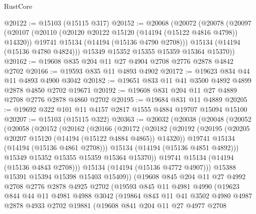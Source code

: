 \begin{lexlean}{RustCore}
\begin{coremodule}
@20122 := @15103 (@15115 @317)
@20152 := @20068
    (@20072
      (@20078
        (@20097
          (@20107
            (@20110 (@20120 @20122 @15120 (@14194 (@15122 @4816 @4798)) @14320))
            @19741
            @15134
            (@14194 (@15136 @4790 @2708)))
          @15134
          (@14194 (@15136 @4780 @4824)))
        @15349
        @15352
        @15355
        @15359
        @15364
        @15370))
@20162 := @19608 @835 @204 @11 @27 @4904 @2708 @2776 @2878 @4842 @2702
@20166 := @19593 @835 @11 @4893 @4902
@20172 := @19623 @834 @44 @11 @4893 @4900 @3042
@20182 := @19651 @833 @11 @41 @3500 @4892 @4899 @2878 @4850 @2702 @19671
@20192 := @19608 @831 @204 @11 @27 @4889 @2708 @2776 @2878 @4860 @2702
@20195 := @19684 @831 @11 @4889
@20205 := @19692 @322 @101 @11 @4157 @2817 @1555 @4884 @19707 @15094 @15100
@20207 := @15103 (@15115 @322)
@20363 := @20032
    (@20038
      (@20048
        (@20052
          (@20058
            (@20152
              (@20162
                (@20166
                  (@20172
                    (@20182
                      (@20192
                        (@20195 (@20205 @20207 @15120 (@14194 (@15122 @4884 @4865)) @14320))
                        @19741
                        @15134
                        (@14194 (@15136 @4861 @2708)))
                      @15134
                      (@14194 (@15136 @4851 @4892)))
                    @15349
                    @15352
                    @15355
                    @15359
                    @15364
                    @15370))
                @19741
                @15134
                (@14194 (@15136 @4843 @2708)))
              @15134
              (@14194 (@15136 @4772 @4907)))
            @15388
            @15391
            @15394
            @15398
            @15403
            @15409))
        (@19608
          @845
          @204
          @11
          @27
          @4992
          @2708
          @2776
          @2878
          @4925
          @2702
          (@19593
            @845
            @11
            @4981
            @4990
            (@19623
              @844
              @44
              @11
              @4981
              @4988
              @3042
              (@19864
                @843
                @11
                @41
                @3502
                @4980
                @4987
                @2878
                @4933
                @2702
                @19881
                (@19608
                  @841
                  @204
                  @11
                  @27
                  @4977
                  @2708

\end{coremodule}
\end{lexlean}
